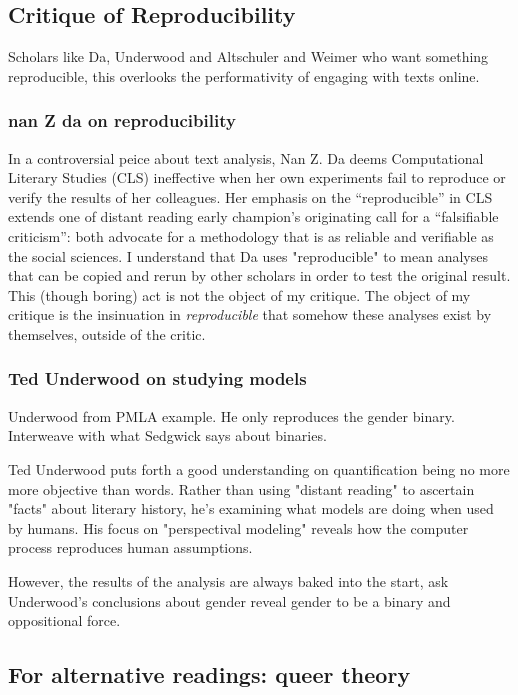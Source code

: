 \documentclass[11pt]{article}
\begin{document}
\subsection{Critique of Reproducibility}
\label{sec:org023453a}
Scholars like Da, Underwood and Altschuler and Weimer who want something
reproducible, this overlooks the performativity of engaging with texts
online. 
\subsubsection{nan Z da on reproducibility}
\label{sec:orgd287e7e}
In a controversial peice about text analysis, Nan Z. Da deems
Computational Literary Studies (CLS) ineffective when her own
experiments fail to reproduce or verify the results of her
colleagues. Her emphasis on the “reproducible” in CLS extends one of
distant reading early champion's originating call for a “falsifiable
criticism”: both advocate for a methodology that is as reliable and
verifiable as the social sciences. I understand that Da uses
"reproducible" to mean analyses that can be copied and rerun by other
scholars in order to test the original result. This (though boring)
act is not the object of my critique. The object of my critique is the
insinuation in \emph{reproducible} that somehow these analyses exist by
themselves, outside of the critic.

\subsubsection{Ted Underwood on studying models}
\label{sec:orga452f3f}

Underwood from PMLA example. He only reproduces the gender
binary. Interweave with what Sedgwick says about binaries.

Ted Underwood puts forth a good understanding on quantification being
no more more objective than words. Rather than using "distant reading"
to ascertain "facts" about literary history, he's examining what
models are doing when used by humans. His focus on "perspectival
modeling" reveals how the computer process reproduces human
assumptions.

However, the results of the analysis are always baked into the start,
ask Underwood's conclusions about gender reveal gender to be a binary
and oppositional force.


\subsection{For alternative readings: queer theory}
\label{sec:org1d2a005}
\end{document}
